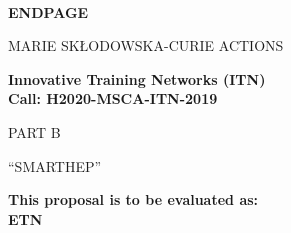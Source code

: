 \documentclass[11pt,a4paper]{article}
\def\acronym{SMARTHEP\xspace}
\begin{document}
%
%


%

\begin{center}

\mbox{ }\\[1ex
\vspace{1cm}]

{\LARGE\bf ENDPAGE}

\vspace{2.5cm}


{\LARGE MARIE SK\L ODOWSKA-CURIE ACTIONS}\\[2ex]

\vspace{2cm}

{\LARGE\bf Innovative Training Networks (ITN)\\
Call: H2020-MSCA-ITN-2019}\\[2ex]

\vspace{3.cm}

{\LARGE PART B}

\vspace{2.5cm}

{\LARGE ``\acronym'' }

\vspace{2.5cm}
 
{\large\bf This proposal is to be evaluated as:}\\
{\large\bf ETN}

\vspace{2.cm}

\end{center}
\end{document}
